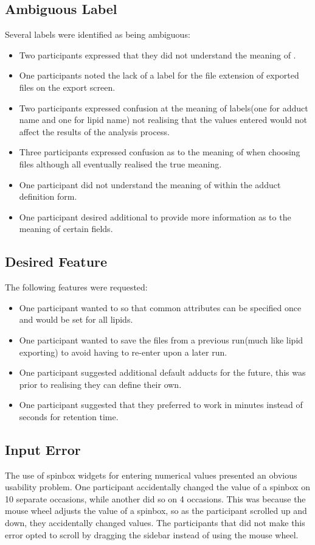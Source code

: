 \documentclass{l4proj}
\begin{document}
\subsection{Ambiguous Label}
Several labels were identified as being ambiguous:
\begin{itemize}
    \item Two participants expressed that they did not understand the meaning of .
    \item One participants noted the lack of a label for the file extension of exported files on the export screen.
    \item Two participants expressed confusion at the meaning of  labels(one for adduct name and one for lipid name) not realising that the values entered would not affect the results of the analysis process.
    \item Three participants expressed confusion as to the meaning of  when choosing files although all eventually realised the true meaning.
    \item One participant did not understand the meaning of  within the adduct definition form.
    \item One participant desired additional  to provide more information as to the meaning of certain fields. 
\end{itemize}
\subsection{Desired Feature}
The following features were requested:
\begin{itemize}
    \item One participant wanted to  so that common attributes can be specified once and would be set for all lipids.
    \item One participant wanted to save the files from a previous run(much like lipid exporting) to avoid having to re-enter upon a later run.
    \item One participant suggested additional default adducts for the future, this was prior to realising they can define their own.
    \item One participant suggested that they preferred to work in minutes instead of seconds for retention time.
\end{itemize}
\subsection{Input Error}
The use of spinbox widgets for entering numerical values presented an obvious usability problem. One participant accidentally changed the value of a spinbox on 10 separate occasions, while another did so on 4 occasions. This was because the mouse wheel adjusts the value of a spinbox, so as the participant scrolled up and down, they accidentally changed values. The participants that did not make this error opted to scroll by dragging the sidebar instead of using the mouse wheel.
\end{document}
